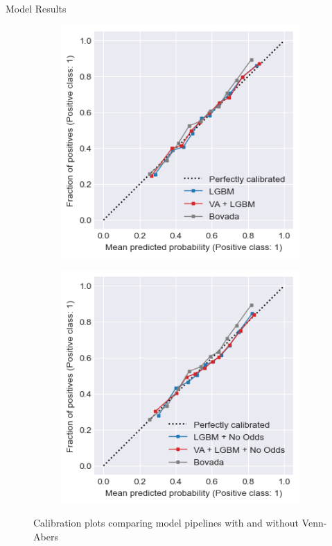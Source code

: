 \documentclass[final]{beamer}
\newlength{\colwidth}
\begin{document}
\begin{frame}[t]
\begin{columns}[t]
\begin{column}{\colwidth}
\begin{block}{Model Results}
\begin{figure}
\begin{subfigure}{.24\linewidth}
        \end{subfigure}
        \begin{subfigure}{.24\linewidth}
            \centering
            \includegraphics[width=\linewidth]{figures/lightgbm_and_va.png}
        \end{subfigure}
        \begin{subfigure}{.24\linewidth}
            \centering
            \includegraphics[width=\linewidth]{figures/lightgbm_no_odds_and_va.png}
        \end{subfigure}
        \caption{Calibration plots comparing model pipelines with and without Venn-Abers}
    \end{figure}
    


\end{block}
\end{column}
\end{columns}
\end{frame}
\end{document}
